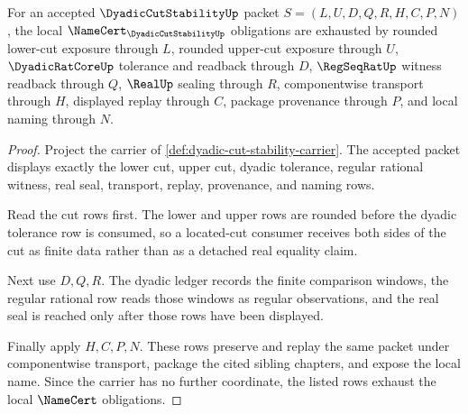 \begin{theorem}
\label{thm:dyadic-cut-stability-namecert-obligations}
For an accepted $\DyadicCutStabilityUp$ packet $S=(L,U,D,Q,R,H,C,P,N)$, the local $\NameCert_{\DyadicCutStabilityUp}$ obligations are exhausted by rounded lower-cut exposure through $L$, rounded upper-cut exposure through $U$, $\DyadicRatCoreUp$ tolerance and readback through $D$, $\RegSeqRatUp$ witness readback through $Q$, $\RealUp$ sealing through $R$, componentwise transport through $H$, displayed replay through $C$, package provenance through $P$, and local naming through $N$.
\end{theorem}
\begin{proof}
Project the carrier of \autoref{def:dyadic-cut-stability-carrier}. The accepted packet displays exactly the lower cut, upper cut, dyadic tolerance, regular rational witness, real seal, transport, replay, provenance, and naming rows.

Read the cut rows first. The lower and upper rows are rounded before the dyadic tolerance row is consumed, so a located-cut consumer receives both sides of the cut as finite data rather than as a detached real equality claim.

Next use $D,Q,R$. The dyadic ledger records the finite comparison windows, the regular rational row reads those windows as regular observations, and the real seal is reached only after those rows have been displayed.

Finally apply $H,C,P,N$. These rows preserve and replay the same packet under componentwise transport, package the cited sibling chapters, and expose the local name. Since the carrier has no further coordinate, the listed rows exhaust the local $\NameCert$ obligations.
\end{proof}


